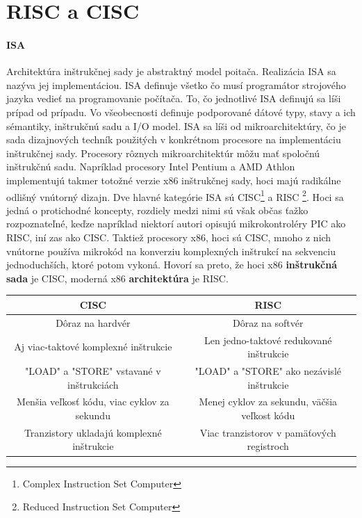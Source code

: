 \documentclass[11pt,a4paper]{report}
\begin{document}
\section{RISC a CISC} \paragraph{ISA} Architektúra inštrukčnej sady je abstraktný model poitača. Realizácia ISA sa nazýva jej implementáciou. ISA definuje všetko čo musí programátor strojového jazyka vedieť na programovanie počítača. To, čo jednotlivé ISA definujú sa líši prípad od prípadu. Vo všeobecnosti definuje podporované dátové typy, stavy a ich sémantiky, inštrukčnú sadu a I/O model. ISA sa líši od mikroarchitektúry, čo je sada dizajnových techník použitých v konkrétnom procesore na implementáciu inštrukčnej sady. Procesory rôznych mikroarchitektúr môžu mať spoločnú inštrukčnú sadu. Napríklad procesory Intel Pentium a AMD Athlon implementujú takmer totožné verzie x86 inštrukčnej sady, hoci majú radikálne odlišný vnútorný dizajn. Dve hlavné kategórie ISA sú CISC\footnote{Complex Instruction Set Computer} a RISC \footnote{Reduced Instruction Set Computer}. Hoci sa jedná o protichodné koncepty, rozdiely medzi nimi sú však občas ťažko rozpoznateľné, keďze napríklad niektorí autori opisujú mikrokontroléry PIC ako RISC, iní zas ako CISC. Taktiež procesory x86, hoci sú CISC, mnoho z nich vnútorne používa mikrokód na konverziu komplexných inštrukcí na sekvenciu jednoduchších, ktoré potom vykoná. Hovorí sa preto, že hoci x86 \textbf{inštrukčná sada} je CISC, moderná x86 \textbf{architektúra} je RISC.

\tabcolsep=0.10cm
\begin{center}
\begin{tabular}{ | c | c | }
 \hline
 CISC  & RISC \\ 
 \hline
 \hline
 Dôraz na hardvér & Dôraz na softvér\\
 \hline
  Aj viac-taktové komplexné inštrukcie & Len jedno-taktové redukované inštrukcie \\ 
 \hline
 "LOAD" a "STORE" vstavané v inštrukciách & "LOAD" a "STORE" ako nezávislé inštrukcie \\ 
 \hline
 Menšia veľkosť kódu, viac cyklov za sekundu & Menej cyklov za sekundu, väčšia veľkost kódu \\ 
 \hline
 Tranzistory ukladajú komplexné inštrukcie & Viac tranzistorov v pamäťových registroch \\ 
 \hline
\end{tabular}
\end{center}
\end{document}
